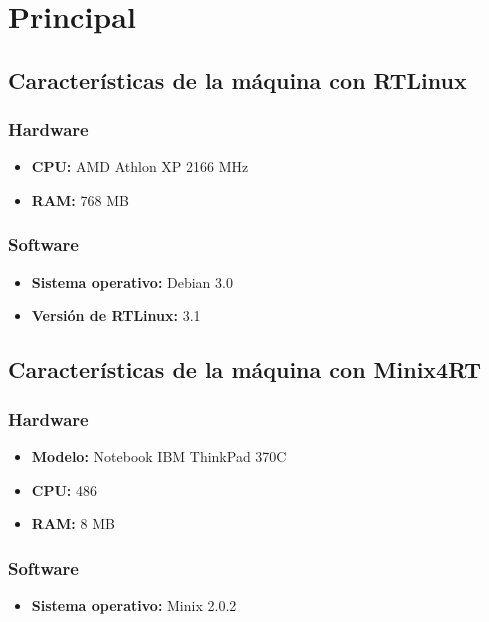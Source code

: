 \section{Principal}

\subsection{Características de la máquina con RTLinux}

\subsubsection{Hardware}
\begin{itemize}
\item \textbf{CPU:} AMD Athlon XP 2166 MHz
\item \textbf{RAM:} 768 MB
\end{itemize}

\subsubsection{Software}
\begin{itemize}
\item \textbf{Sistema operativo:} Debian 3.0
\item \textbf{Versión de RTLinux:} 3.1
\end{itemize}


\subsection{Características de la máquina con Minix4RT}

\subsubsection{Hardware}
\begin{itemize}
\item \textbf{Modelo:} Notebook IBM ThinkPad 370C
\item \textbf{CPU:} 486
\item \textbf{RAM:} 8 MB
\end{itemize}

\subsubsection{Software}
\begin{itemize}
\item \textbf{Sistema operativo:} Minix 2.0.2
\end{itemize}


